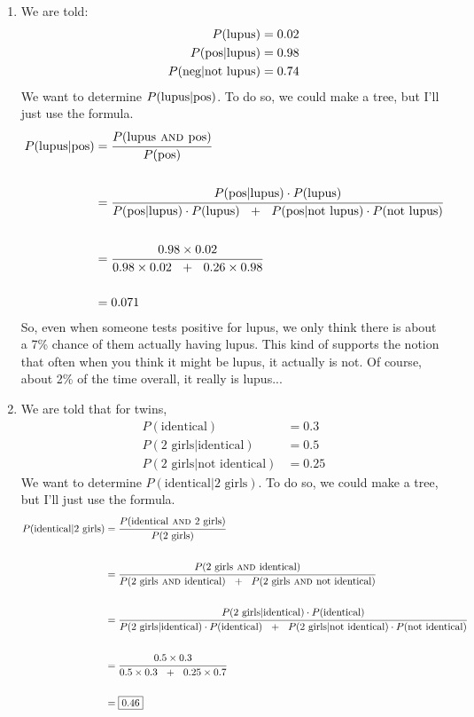 \documentclass[12pt,letterpaper]{article}
\begin{document}
\begin{enumerate}
\newcommand{\lupus}{\text{lupus}}
\newcommand{\nlupus}{\text{not lupus}}

\item We are told:
\begin{align*}
P(\lupus) &= 0.02 \\
P(\pos|\lupus) &= 0.98 \\
P(\nega|\nlupus) &= 0.74
\end{align*}
We want to determine $P(\lupus|\pos)$. To do so, we could make a tree, but I'll just use the formula.
\begin{align*}
P(\lupus|\pos) &= \cfrac{P(\lupus \AND \pos)}{P(\pos)} \\\\
&= \cfrac{P(\pos|\lupus) \cdot P(\lupus)}{P(\pos|\lupus)\cdot P(\lupus) ~~+~~ P(\pos|\nlupus)\cdot P(\nlupus)}\\\\
&= \cfrac{0.98 \times 0.02}{0.98\times 0.02 ~~+~~ 0.26\times 0.98}\\\\
&= 0.071
\end{align*}
So, even when someone tests positive for lupus, we only think there is about a 7\% chance of them actually having lupus. This kind of supports the notion that often when you think it might be lupus, it actually is not. Of course, about 2\% of the time overall, it really is lupus...

\item We are told that for twins,
\begin{align*}
P(\text{identical}) &= 0.3\\
P(\text{2 girls}|\text{identical}) &= 0.5 \\
P(\text{2 girls}|\text{not identical}) &= 0.25
\end{align*}
We want to determine $P(\text{identical}|\text{2 girls})$. To do so, we could make a tree, but I'll just use the formula.
\begin{align*}
P(\text{identical}|\text{2 girls}) &= \cfrac{P(\text{identical} \textsc{~and~} \text{2 girls})}{P(\text{2 girls})} \\\\
&= \cfrac{P(\text{2 girls} \textsc{~and~} \text{identical})}{P(\text{2 girls} \textsc{~and~} \text{identical}) ~~+~~ P(\text{2 girls}\textsc{~and~} \text{not identical})}\\\\
&= \cfrac{P(\text{2 girls}|\text{identical}) \cdot P(\text{identical})}{P(\text{2 girls}|\text{identical})\cdot P(\text{identical}) ~~+~~ P(\text{2 girls}|\text{not identical})\cdot P(\text{not identical})}\\\\
&= \cfrac{0.5 \times 0.3}{0.5\times 0.3 ~~+~~ 0.25\times 0.7}\\\\
&= \fbox{0.46}
\end{align*}

\end{enumerate}
\end{document}
